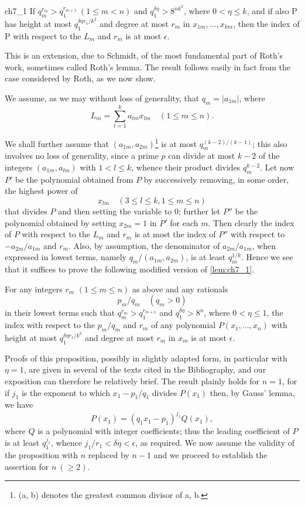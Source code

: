 \begin{mylemma}{}{ch7_1}
If  $q_m^{r_m} > q_1^{r_{m+1}} \ (1 \le m < n)$  and  $q_1^{\delta \eta} > 8^{nk^2}$, where  $0 < \eta \le k$, and if also P has height at most  $q_1^{\delta \eta r_1/k^2}$  and degree at most  $r_m$  in  $x_{1m}, \ldots, x_{km}$, then the index of P with respect to the  $L_m$  and  $r_m$  is at most  $\epsilon$.
\end{mylemma}

This is an extension, due to Schmidt, of the most fundamental part of Roth's work, sometimes called Roth's lemma. The result follows easily in fact from the case considered by Roth, as we now show.

We assume, as we may without loss of generality, that  $q_m = |a_{1m}|$, where
\[L_m = \sum_{l=1}^k a_{lm} x_{lm} \quad (1 \leqslant m \leqslant n).\]

We shall further assume that $(a_{1m}, a_{2m})$\footnote{(a, b) denotes the greatest common divisor of a, b.} is at most $q_m^{(k-2)/(k-1)}$; this also involves no loss of generality, since a prime $p$ can divide at most $k-2$ of the integers $(a_{1m}, a_{lm})$ with $1 < l \le k$, whence their product divides $q_m^{k-2}$. Let now $P'$ be the polynomial obtained from $P$ by successively removing, in some order, the highest power of
\[x_{lm} \quad (3 \leqslant l \leqslant k, 1 \leqslant m \leqslant n)\]
that divides $P$ and then setting the variable to 0; further let $P''$ be the polynomial obtained by setting $x_{2m} = 1$ in $P'$ for each $m$. Then clearly the index of $P$ with respect to the $L_m$ and $r_m$ is at most the index of $P''$ with respect to $-a_{2m}/a_{1m}$ and $r_m$. Also, by assumption, the denominator of $a_{2m}/a_{1m}$, when expressed in lowest terms, namely $q_m/(a_{1m}, a_{2m})$, is at least $q_m^{1/k}$. Hence we see that it suffices to prove the following modified version of \autoref{lem:ch7_1}.

For any integers $r_m$ $(1 \leq m \leq n)$ as above and any rationals
\[p_m/q_m \quad (q_m > 0)\]
in their lowest terms such that $q_m^{r_m} > q_1^{r_{m+1}}$ and $q_1^{\delta \eta} > 8^n$, where $0 < \eta \leqslant 1$, the index with respect to the $p_m/q_m$ and $r_m$ of any polynomial $P(x_1,\dots,x_n)$ with height at most $q_1^{\delta \eta r_1/k^2}$ and degree at most $r_m$ in $x_m$ is at most $\epsilon$.

Proofs of this proposition, possibly in slightly adapted form, in particular with $\eta=1$, are given in several of the texts cited in the Bibliography, and our exposition can therefore be relatively brief. The result plainly holds for $n=1$, for if $j_1$ is the exponent to which $x_1-p_1/q_1$ divides $P(x_1)$ then, by Gauss' lemma, we have
\[P(x_1) = (q_1x_1 - p_1)^{j_1}Q(x_1),\]
where $Q$ is a polynomial with integer coefficients; thus the leading coefficient of $P$ is at least $q_1^{j_1}$, whence $j_1/r_1 < \delta \eta < \epsilon$, as required. We now assume the validity of the proposition with $n$ replaced by $n-1$ and we proceed to establish the assertion for $n \ (\geq 2)$.

